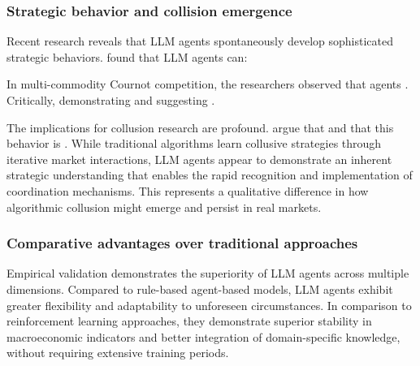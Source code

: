 \subsubsection*{Strategic behavior and collision emergence}

Recent research reveals that LLM agents spontaneously develop sophisticated strategic behaviors. \textcite[p.1]{lin_strategic_2025} found that LLM agents can:
    \begin{displayquote}
    \end{displayquote}
In multi-commodity Cournot competition, the researchers observed that agents  \parencite[p.2]{lin_strategic_2025}. Critically,  \parencite[p.6]{lin_strategic_2025} demonstrating  and suggesting  \parencite[p.6]{lin_strategic_2025}.

The implications for collusion research are profound. \textcite[p.8]{lin_strategic_2025} argue that  and that this behavior is . While traditional algorithms learn collusive strategies through iterative market interactions, LLM agents appear to demonstrate an inherent strategic understanding that enables the rapid recognition and implementation of coordination mechanisms. This represents a qualitative difference in how algorithmic collusion might emerge and persist in real markets.

\subsubsection*{Comparative advantages over traditional approaches}

Empirical validation demonstrates the superiority of LLM agents across multiple dimensions. Compared to rule-based agent-based models, LLM agents exhibit greater flexibility and adaptability to unforeseen circumstances. In comparison to reinforcement learning approaches, they demonstrate superior stability in macroeconomic indicators and better integration of domain-specific knowledge, without requiring extensive training periods.

